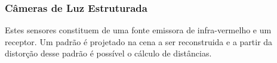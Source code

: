 
\subsubsection{Câmeras de Luz Estruturada}

Estes sensores constituem de uma fonte emissora de infra-vermelho e um receptor.
Um padrão é projetado na cena a ser reconstruida e a partir da distorção desse
padrão é possível o cálculo de distâncias. 




